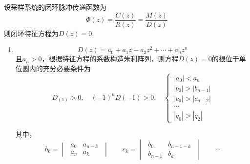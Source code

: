 设采样系统的闭环脉冲传递函数为
\begin{equation}
	\varPhi(z) = \dfrac{C(z)}{R(z)} = \dfrac{M(z)}{D(z)}
\end{equation}
则闭环特征方程为$D(z) = 0.$
\begin{enumerate}[\hspace*{2em} (1) ]
	\item {}
	\begin{equation}
		D(z) = a_0 + a_1 z + a_2 z^2 + \cdots + a_n z^n
	\end{equation}
	且$a_n>0$，根据特征方程的系数构造朱利阵列，则方程$D(z) = 0$的根位于单位圆内的充分必要条件为
	\begin{equation}
		D_(1)>0, \quad (-1)^nD(-1)>0, \quad 
		\begin{cases}
			\, |a_0| < a_n\\
			\, |b_0| > |b_{n-1}|\\
			\, |c_0| > |c_{n-2}|\\
			\, \cdots\\
			\, |q_0| > |q_2|
		\end{cases}
	\end{equation} 
	
	\begin{table}
		\centering
	\caption{朱利阵列}
	\label{朱利阵列}
	\end{table}
	其中，
	\begin{equation}
		b_k = 
		\begin{vmatrix}
			\,\, a_0 & a_{n-k} \,\,\\
			\,\, a_n & a_k \,\,
		\end{vmatrix}
		\quad \quad
		c_k = 
		\begin{vmatrix}
			\,\, b_0 & b_{n-1-k} \,\,\\
			\,\, b_{n-1} & b_k \,\,
		\end{vmatrix}
		\quad \quad \cdots
	\end{equation}


\end{enumerate}
